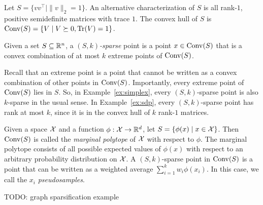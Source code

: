 \documentclass[paper.tex]{subfiles}
\begin{document}
\begin{example}
\label{ex:sdp}
Let $S = \{vv^{\top} \mid \|v\|_2 = 1\}$. An alternative characterization 
of $S$ is all rank-$1$, positive semidefinite matrices with trace $1$. The 
convex hull of $S$ is $\operatorname{Conv}(S) = \{V \mid V \succeq 0, \operatorname{Tr}(V) = 1\}$.
\end{example}

\begin{definition}
Given a set $S \subseteq \mathbb{R}^n$, a \emph{$(S, k)$-sparse} point is a point 
$x \in \operatorname{Conv}(S)$ that is a convex combination of at most $k$ extreme 
points of $\operatorname{Conv}(S)$.
\end{definition}

Recall that an extreme point is a point that cannot be written as a convex 
combination of other points in $\operatorname{Conv}(S)$. Importantly, every extreme point 
of $\operatorname{Conv}(S)$ lies in $S$. So, in Example~\ref{ex:simplex}, every 
$(S,k)$-sparse point is also $k$-sparse in the usual sense. In 
Example~\ref{ex:sdp}, every $(S,k)$-sparse point has rank at most $k$, since 
it is in the convex hull of $k$ rank-$1$ matrices.

\begin{example}
\label{ex:marginal-polytope}
Given a space $\mathcal{X}$ and a function $\phi : \mathcal{X} \to \mathbb{R}^d$, let 
$S = \{\phi(x) \mid x \in \mathcal{X}\}$. Then $\operatorname{Conv}(S)$ is called the 
\emph{marginal polytope} of $\mathcal{X}$ with respect to $\phi$. The 
marginal polytope consists of all possible expected values of 
$\phi(x)$ with respect to an arbitrary probability distribution 
on $\mathcal{X}$. A $(S,k)$-sparse point in $\operatorname{Conv}(S)$ is a point that 
can be written as a weighted average $\sum_{i=1}^k w_i \phi(x_i)$. 
In this case, we call the $x_i$ \emph{pseudosamples}.
\end{example}

\begin{example}
\label{ex:graph}
TODO: graph sparsification example
\end{example}
\end{document}
